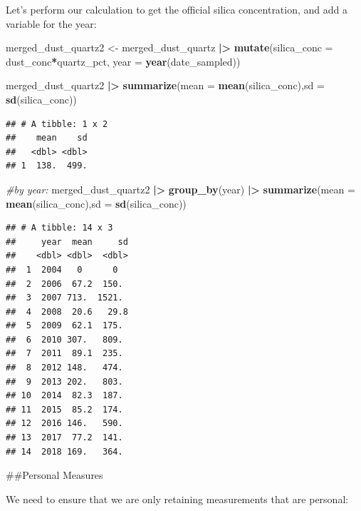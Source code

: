 \documentclass[
]{article}
\newenvironment{Shaded}{\begin{snugshade}}{\end{snugshade}}
\newcommand{\AttributeTok}[1]{\textcolor[rgb]{0.13,0.29,0.53}{#1}}
\newcommand{\CommentTok}[1]{\textcolor[rgb]{0.56,0.35,0.01}{\textit{#1}}}
\newcommand{\FunctionTok}[1]{\textcolor[rgb]{0.13,0.29,0.53}{\textbf{#1}}}
\newcommand{\NormalTok}[1]{#1}
\newcommand{\OtherTok}[1]{\textcolor[rgb]{0.56,0.35,0.01}{#1}}
\newcommand{\SpecialCharTok}[1]{\textcolor[rgb]{0.81,0.36,0.00}{\textbf{#1}}}
\begin{document}
Let's perform our calculation to get the official silica concentration,
and add a variable for the year:

\begin{Shaded}
\begin{Highlighting}[]
\NormalTok{merged\_dust\_quartz2 }\OtherTok{\textless{}{-}}\NormalTok{ merged\_dust\_quartz }\SpecialCharTok{|\textgreater{}} 
  \FunctionTok{mutate}\NormalTok{(}\AttributeTok{silica\_conc =}\NormalTok{ dust\_conc}\SpecialCharTok{*}\NormalTok{quartz\_pct,}
         \AttributeTok{year =} \FunctionTok{year}\NormalTok{(date\_sampled)) }

\NormalTok{merged\_dust\_quartz2 }\SpecialCharTok{|\textgreater{}} 
  \FunctionTok{summarize}\NormalTok{(}\AttributeTok{mean =} \FunctionTok{mean}\NormalTok{(silica\_conc),}\AttributeTok{sd =} \FunctionTok{sd}\NormalTok{(silica\_conc)) }
\end{Highlighting}
\end{Shaded}

\begin{verbatim}
## # A tibble: 1 x 2
##    mean    sd
##   <dbl> <dbl>
## 1  138.  499.
\end{verbatim}

\begin{Shaded}
\begin{Highlighting}[]
\CommentTok{\#by year: }
\NormalTok{merged\_dust\_quartz2 }\SpecialCharTok{|\textgreater{}} 
  \FunctionTok{group\_by}\NormalTok{(year) }\SpecialCharTok{|\textgreater{}} 
  \FunctionTok{summarize}\NormalTok{(}\AttributeTok{mean =} \FunctionTok{mean}\NormalTok{(silica\_conc),}\AttributeTok{sd =} \FunctionTok{sd}\NormalTok{(silica\_conc)) }
\end{Highlighting}
\end{Shaded}

\begin{verbatim}
## # A tibble: 14 x 3
##     year  mean     sd
##    <dbl> <dbl>  <dbl>
##  1  2004   0      0  
##  2  2006  67.2  150. 
##  3  2007 713.  1521. 
##  4  2008  20.6   29.8
##  5  2009  62.1  175. 
##  6  2010 307.   809. 
##  7  2011  89.1  235. 
##  8  2012 148.   474. 
##  9  2013 202.   803. 
## 10  2014  82.3  187. 
## 11  2015  85.2  174. 
## 12  2016 146.   590. 
## 13  2017  77.2  141. 
## 14  2018 169.   364.
\end{verbatim}

\#\#Personal Measures

We need to ensure that we are only retaining measurements that are
personal:
\end{document}
